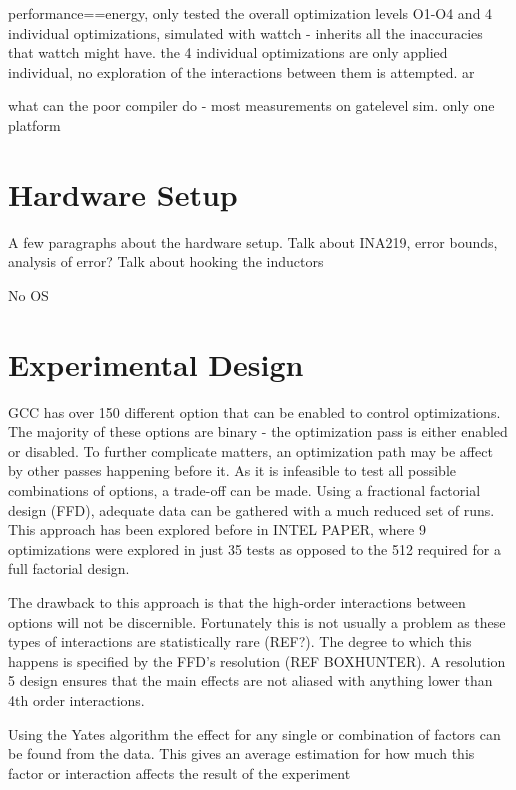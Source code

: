 \documentclass[twocolumn]{article}
\begin{document}
performance==energy, only tested the overall optimization levels O1-O4 and 4 individual optimizations, simulated with wattch - inherits all the inaccuracies that wattch might have. the 4 individual optimizations are only applied individual, no exploration of the interactions between them is attempted. ar

what can the poor compiler do - most measurements on gatelevel sim. only one platform

\section*{Hardware Setup}

A few paragraphs about the hardware setup.
Talk about INA219, error bounds, analysis of error?
Talk about hooking the inductors

No OS

\section*{Experimental Design}

GCC has over 150 different option that can be enabled to control optimizations. The majority of these options are binary - the optimization pass is either enabled or disabled. To further complicate matters, an optimization path may be affect by other passes happening before it. As it is infeasible to test all possible combinations of options, a trade-off can be made. Using a fractional factorial design (FFD), adequate data can be gathered with a much reduced set of runs. This approach has been explored before in INTEL PAPER, where 9 optimizations were explored in just 35 tests as opposed to the 512 required for a full factorial design.

The drawback to this approach is that the high-order interactions between options will not be discernible. Fortunately this is not usually a problem as these types of interactions are statistically rare (REF?). The degree to which this happens is specified by the FFD's resolution (REF BOXHUNTER). A resolution 5 design ensures that the main effects are not aliased with anything lower than 4th order interactions.

Using the Yates algorithm the effect for any single or combination of factors can be found from the data. This gives an average estimation for how much this factor or interaction affects the result of the experiment

\end{document}
